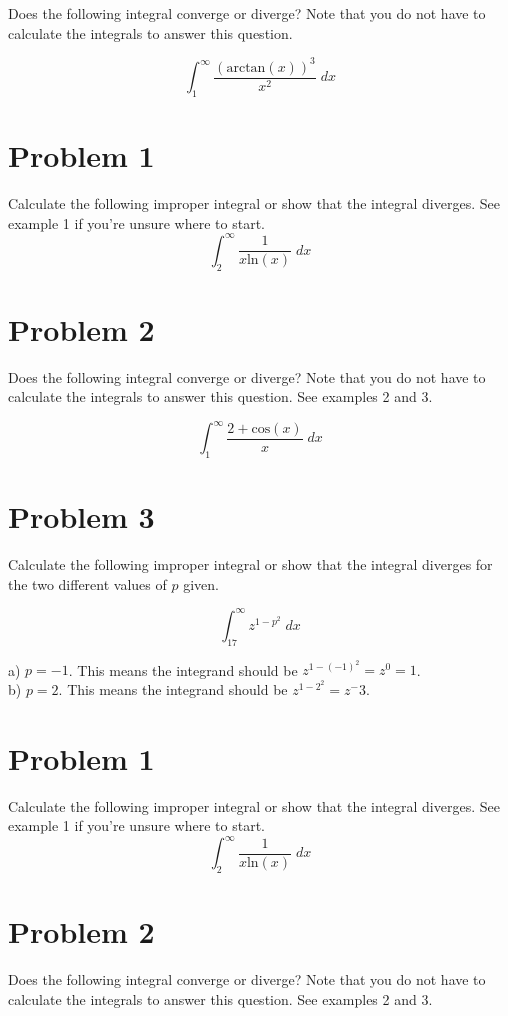 \documentclass[11pt]{article}
\begin{document}
Does the following integral converge or diverge? Note that you do not have to calculate the integrals to answer this question.

$$\int_{1}^{\infty} \frac{(\text{arctan}(x))^3}{x^2} \; dx$$

\newpage

\section*{Problem 1}

Calculate the following improper integral or show that the integral diverges. See example 1 if you're unsure where to start.
$$\int_{2}^\infty \frac{1}{x\text{ln}(x)} \; dx$$
$$$$
$$$$
$$$$
\section*{Problem 2}
Does the following integral converge or diverge? Note that you do not have to calculate the integrals to answer this question. See examples 2 and 3.

$$\int_{1}^{\infty} \frac{2+\text{cos}(x)}{x} \; dx$$
$$$$
$$$$
$$$$

\section*{Problem 3}
Calculate the following improper integral or show that the integral diverges for the two different values of $p$ given.

$$\int_{17}^{\infty} z^{1-p^2} \; dx$$

a) $p = -1$. This means the integrand should be $z^{1-(-1)^2} = z^0 = 1$.\\
b) $p = 2$. This means the integrand should be $z^{1-2^2} = z^-3$. 

\newpage
\section*{Problem 1}

Calculate the following improper integral or show that the integral diverges. See example 1 if you're unsure where to start.
$$\int_{2}^\infty \frac{1}{x\text{ln}(x)} \; dx$$
$$$$
$$$$
$$$$

\newpage
\section*{Problem 2}
Does the following integral converge or diverge? Note that you do not have to calculate the integrals to answer this question. See examples 2 and 3.
\end{document}
